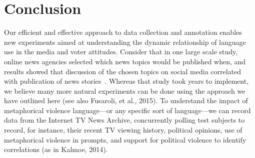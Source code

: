 




\section{Conclusion}

Our efficient and effective approach to data collection and annotation enables
new experiments aimed at understanding the dynamic relationship of language use
in the media and voter attitudes. Consider that in one large scale study, online
news agencies selected which news topics would be published when, and results
showed that discussion of the chosen topics on social media correlated with
publication of news stories~\cite{King2017}. Whereas that study took years to
implement, we believe many more natural experiments can be done using the
approach we have outlined here (see also Fusaroli, et al., 2015). To understand the
impact of metaphorical violence language---or any specific sort of language---we
can record data from the Internet TV News Archive, concurrently polling test
subjects to record, for instance,
their recent TV viewing history, political opinions, use of metaphorical violence
in prompts, and support for political
violence to identify correlations (as in Kalmoe, 2014). 

